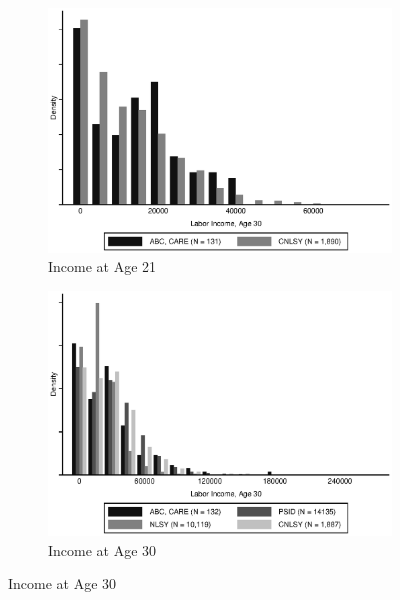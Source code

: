 \begin{figure}[H]
	\caption{Support of ABC/CARE and Auxiliary Data} \label{fig:support}
	\begin{subfigure}[h]{0.8\textwidth}
	\centering
	\caption{Income at Age 21} \label{fig:support_inc21}
	\includegraphics[width=\textwidth]{AppOutput/Methodology/support_inc21.eps}
	\end{subfigure}
	
	\begin{subfigure}[h]{0.8\textwidth}
	\centering
	\caption{Income at Age 30} \label{fig:support_inc30}
	\includegraphics[width=\textwidth]{AppOutput/Methodology/support_inc30.eps}
	\end{subfigure}
\end{figure}




